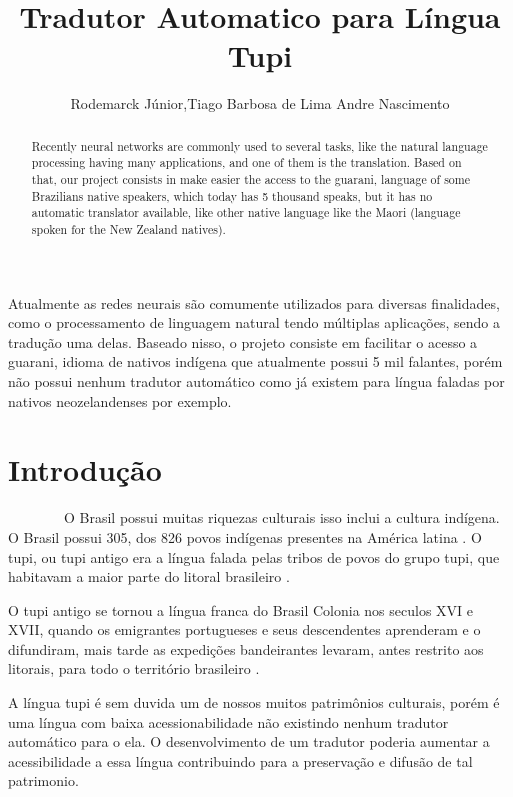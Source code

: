 \documentclass[12pt]{article}
\title{Tradutor Automatico para Língua Tupi}
\author{Rodemarck Júnior\inst{1},Tiago Barbosa de Lima\inst{1} Andre Nascimento\inst{1} }
\begin{document}
 

\maketitle
\begin{abstract}

    Recently neural networks are commonly used to several tasks, like the natural language processing having many applications, and one of them is the translation. Based on that, our project consists in make easier the access to the guarani, language of some Brazilians native speakers, which today has 5 thousand speaks, but it has no automatic translator available, like other native language like the Maori (language spoken for the New Zealand natives).
\end{abstract}

\begin{resumo}
Atualmente as redes neurais são comumente utilizados para diversas finalidades, como o processamento de linguagem natural tendo múltiplas aplicações, sendo a tradução uma delas. Baseado nisso, o projeto consiste em facilitar o acesso a guarani, idioma de nativos indígena que atualmente possui 5 mil falantes, porém não possui nenhum tradutor automático como já existem para língua faladas por nativos neozelandenses por exemplo.
\end{resumo}


\section{Introdução} 

~~~~~~~~O Brasil possui muitas riquezas culturais isso inclui a cultura indígena. O Brasil possui 305, dos 826 povos indígenas presentes na América latina \cite{povos_indigenas}. O tupi, ou tupi antigo era a língua falada pelas tribos de povos do grupo tupi, que habitavam a maior parte do litoral brasileiro \cite{Dicionario_Tupi_Antigo}.

O tupi antigo se tornou a língua franca do Brasil Colonia nos seculos XVI e XVII, quando os emigrantes portugueses e seus descendentes aprenderam e o difundiram, mais tarde as expedições bandeirantes levaram, antes restrito aos litorais, para todo o território brasileiro \cite{Tupi_Antigo}.

A língua tupi é sem duvida um de nossos muitos patrimônios culturais,  porém é uma língua com baixa acessionabilidade não existindo nenhum tradutor automático para o ela. O desenvolvimento de um tradutor poderia aumentar a acessibilidade a essa língua contribuindo para a preservação e difusão de tal patrimonio. 
\end{document}
